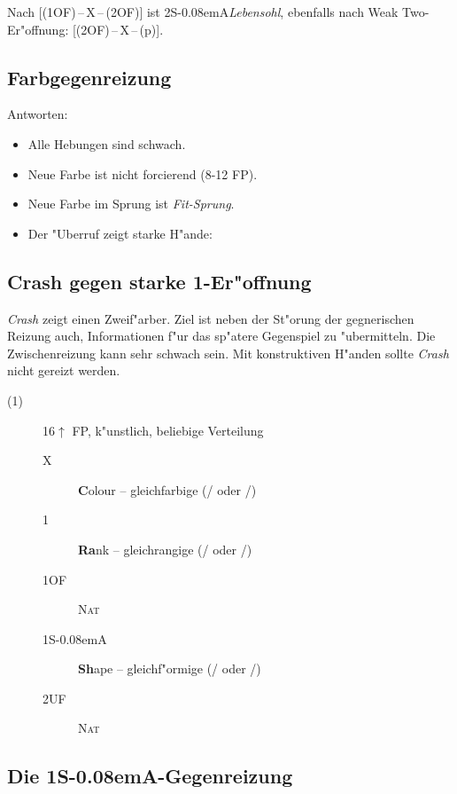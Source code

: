 \documentclass[11pt,german,twocolumn,twoside]{scrartcl}
\def\pi{\Sp\xspace}
\def\co{\He\xspace}
\def\ka{\Di\xspace}
\def\tr{\Cl\xspace}
\def\sa{\nobreak\textsf{S\kern-0.08emA}\xspace}
\def\kar{\nobreak\hspace{\cardskip}\Di\xspace}
\def\tre{\nobreak\hspace{\cardskip}\Cl\xspace}
\def\SA{\nobreak\hspace{\cardskip}\sa}
\def\of{\nobreak\hspace{\cardskip}\textsf{OF}\xspace}
\def\uf{\nobreak\hspace{\cardskip}\textsf{UF}\xspace}
\def\pl{$\uparrow$\xspace}
\def\kontra{\textsf{X}\xspace}
\def\sep{\,--\,}
\newcommand{\conv}[1]{\emph{#1}}
\def\nat{\textsc{Nat}\xspace}
\def\bdsc{\begin{description}}
\def\edsc{\end{description}}
\newcommand{\Index}[1]{#1\index{#1}}
\begin{document}
Nach [(1\of){}\sep\kontra{}\sep(2\of)] ist 2\SA \Index{\conv{Lebensohl}}, ebenfalls
nach \Index{Weak Two}-Er"offnung: [(2\of){}\sep\kontra{}\sep(p)].

\subsection{Farbgegenreizung}

Antworten:
\begin{itemize}
\item Alle Hebungen sind schwach.
\item Neue Farbe ist nicht forcierend (8-12 FP).
\item Neue Farbe im Sprung ist \conv{Fit-Sprung}.
\item Der "Uberruf zeigt starke H"ande:
\end{itemize}

\subsection{Crash gegen starke 1\tre-Er"offnung}

\conv{Crash} zeigt einen Zweif"arber. Ziel ist neben der St"orung der
gegnerischen Reizung auch, Informationen f"ur das sp"atere Gegenspiel
zu "ubermitteln.  Die Zwischenreizung kann sehr schwach sein.  Mit
konstruktiven H"anden sollte \conv{Crash} nicht gereizt werden.

\bdsc
\item[(1\tre)] 16\pl FP, k"unstlich, beliebige Verteilung
\bdsc
\item[\kontra] \textbf{C}olour -- gleichfarbige (\tr/\pi oder \ka/\co)
\item[1\kar] \textbf{Ra}nk -- gleichrangige (\tr/\ka oder \co/\pi)
\item[1\of] \nat
\item[1\SA] \textbf{Sh}ape -- gleichf"ormige (\tr/\co oder \ka/\pi)
\item[2\uf] \nat
\edsc
\edsc

\subsection{Die 1\SA-Gegenreizung}
\end{document}
